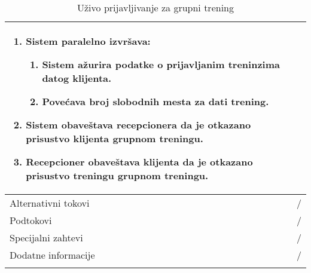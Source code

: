 \documentclass[../grupniTreninzi.tex]{subfiles}
\begin{document}
\begin{longtable}{| p{} | p{} |}
\begin{enumerate}
        \item Sistem paralelno izvršava:
            \begin{enumerate}
                \item Sistem ažurira podatke o prijavljanim treninzima datog klijenta.
                \item Povećava broj slobodnih mesta za dati trening. 
            \end{enumerate}
        \item Sistem obaveštava recepcionera da je otkazano prisustvo klijenta grupnom treningu.
        \item Recepcioner obaveštava klijenta da je otkazano prisustvo treningu grupnom treningu.
    \end{enumerate}\\
\hline
    Alternativni tokovi & /\\
\hline
    Podtokovi & /\\
\hline
    Specijalni zahtevi & /\\
\hline
    Dodatne informacije & /\\
\hline
\caption{Uživo prijavljivanje za grupni trening} %
\end{longtable}
\end{document}
